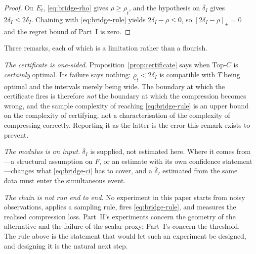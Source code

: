 \begin{proof}
On $E_{t}$, \eqref{eq:bridge-rho} gives $\rho\ge\underline{\rho}_{t}$, and the hypothesis on
$\overline{\delta}_{I}$ gives $2\delta_{I}\le2\overline{\delta}_{I}$. Chaining with
\eqref{eq:bridge-rule} yields $2\delta_{I}-\rho\le0$, so $[2\delta_{I}-\rho]_{+}=0$ and the
regret bound of Part~I is zero.
\end{proof}

Three remarks, each of which is a limitation rather than a flourish.

\emph{The certificate is one-sided.} Proposition~\ref{prop:certificate} says when Top-$C$ is
\emph{certainly} optimal. Its failure says nothing: $\underline{\rho}_{t}<2\overline
{\delta}_{I}$ is compatible with $T$ being optimal and the intervals merely being wide. The
boundary at which the certificate fires is therefore \emph{not} the boundary at which the
compression becomes wrong, and the sample complexity of reaching \eqref{eq:bridge-rule} is an
upper bound on the complexity of certifying, not a characterisation of the complexity of
compressing correctly. Reporting it as the latter is the error this remark exists to prevent.

\emph{The modulus is an input.} $\overline{\delta}_{I}$ is supplied, not estimated here.
Where it comes from---a structural assumption on $F$, or an estimate with its own confidence
statement---changes what \eqref{eq:bridge-ci} has to cover, and a $\overline{\delta}_{I}$
estimated from the same data must enter the simultaneous event.

\emph{The chain is not run end to end.} No experiment in this paper starts from noisy
observations, applies a sampling rule, fires \eqref{eq:bridge-rule}, and measures the realised
compression loss. Part~II's experiments concern the geometry of the alternative and the
failure of the scalar proxy; Part~I's concern the threshold. The rule above is the statement
that would let such an experiment be designed, and designing it is the natural next step.


